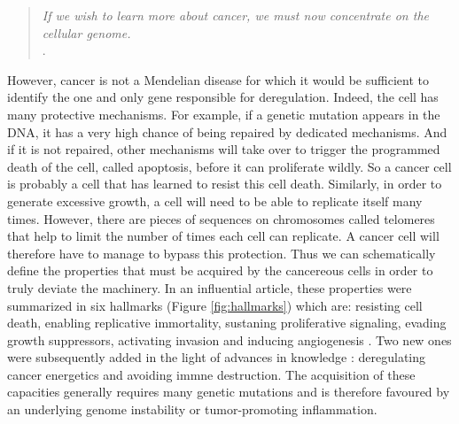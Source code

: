 \documentclass[a4paper,12pt,twoside,onecolumn,openright,final,oldfontcommands]{memoir}
\begin{document}
\begin{quote}
\emph{If we wish to learn more about cancer, we must now concentrate on
the cellular genome.}\\
\citep{dulbecco1986turning}.
\end{quote}

However, cancer is not a Mendelian disease for which it would be
sufficient to identify the one and only gene responsible for
deregulation. Indeed, the cell has many protective mechanisms. For
example, if a genetic mutation appears in the DNA, it has a very high
chance of being repaired by dedicated mechanisms. And if it is not
repaired, other mechanisms will take over to trigger the programmed
death of the cell, called apoptosis, before it can proliferate wildly.
So a cancer cell is probably a cell that has learned to resist this cell
death. Similarly, in order to generate excessive growth, a cell will
need to be able to replicate itself many times. However, there are
pieces of sequences on chromosomes called telomeres that help to limit
the number of times each cell can replicate. A cancer cell will
therefore have to manage to bypass this protection. Thus we can
schematically define the properties that must be acquired by the
cancereous cells in order to truly deviate the machinery. In an
influential article, these properties were summarized in six hallmarks
(Figure \ref{fig:hallmarks}) which are: resisting cell death, enabling
replicative immortality, sustaning proliferative signaling, evading
growth suppressors, activating invasion and inducing angiogenesis
\citep{hanahan2000hallmarks}. Two new ones were subsequently added in
the light of advances in knowledge \citep{hanahan2011hallmarks}:
deregulating cancer energetics and avoiding immne destruction. The
acquisition of these capacities generally requires many genetic
mutations and is therefore favoured by an underlying genome instability
or tumor-promoting inflammation.
\end{document}
